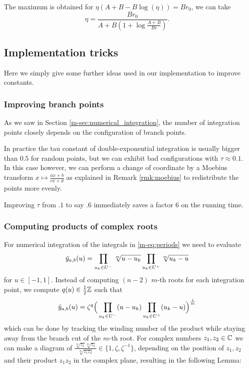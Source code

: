 \documentclass[main.tex]{subfiles}
\begin{document}
   The maximum is obtained for $η(A+B-B\log(η))=Br_0$,
   we can take
   \[ η = \frac{Br_0}{A+B(1+\log\frac{A+B}{Br})}. \]
   
   \subsection{Implementation tricks}

   Here we simply give some further ideas used in our implementation to improve constants.

   \subsubsection{Improving branch points}

   As we saw in Section \ref{m-sec:numerical_integration}, the number of integration points
   closely depends on the configuration of branch points.

   In practice the tau constant of double-exponential integration is usually bigger than $0.5$
   for random points, but we can exhibit bad configurations with $τ\approx 0.1$.
   In this case however, we can perform a change of coordinate by a Moebius transform
   $x\mapsto \frac{ax+b}{cx+d}$ as explained in Remark \ref{rmk:moebius} to redistribute the points more evenly.

   Improving $τ$ from $.1$ to say $.6$ immediately saves a factor $6$ on the running time.

  \subsubsection{Computing products of complex roots}\label{subsec:computing_roots}

  For numerical integration of the integrals in \eqref{m-eq:periods}
  we need to evaluate
  \begin{equation*}
   \tilde{y}_{a,b}(u) = \prod_{u_k\in U^-} \sqrt[m]{u-u_k}\prod_{u_k\in U^+}\sqrt[m]{u_k-u}
  \end{equation*}
  for $u \in [-1,1]$. Instead of computing $(n-2)$ $m$-th roots for each
  integration point, we compute $q(u)\in\frac12\mathbb{Z}$ such that
  \begin{equation*}
   \tilde{y}_{a,b}(u) = \zeta^q \Big( \prod_{u_k\in U^-}(u-u_k) \prod_{u_k\in U^+} (u_k-u) \Big)^{\frac{1}{m}}
  \end{equation*}
 which can be done by tracking
  the winding number of the product while staying away from the branch cut
  of the $m$-th root.
  For complex numbers $z_1,z_2 \in \mathbb{C}$ we can make a diagram of
  $\frac{\sqrt[m]{z_1}\sqrt[m]{z_2}}{\sqrt[m]{z_1z_2}} \in \{ 1, \zeta,
  \zeta^{-1} \}$, depending on the position of $z_1,z_2$ and their product
  $z_1z_2$ in the complex plane, resulting in the following Lemma:
\end{document}
